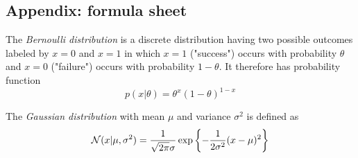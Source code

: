 \documentclass[a4paper]{article}
\begin{document}
\begin{exam}
\newpage
\section*{Appendix: formula sheet}

%
%
%
%
%
The \emph{Bernoulli distribution} is a discrete distribution having two possible outcomes labeled by $x = 0$ and $x = 1$ in which $x = 1$ ("success") occurs with probability $\theta$ and $x = 0$ ("failure") occurs with probability $1-\theta$. It therefore has probability function
\begin{equation}
p(x|\theta) =\theta^x(1-\theta)^{1-x}
\tag{A.1}
\end{equation}

The \emph{Gaussian distribution} with mean $\mu$ and variance $\sigma^2$ is defined as
$$
\mathcal{N}(x|\mu,\sigma^2) = \frac{1}{\sqrt{2\pi}\sigma} \exp\left\{-\frac{1}{2\sigma^2}(x-\mu)^2\right\}
$$
\end{exam}
\end{document}
